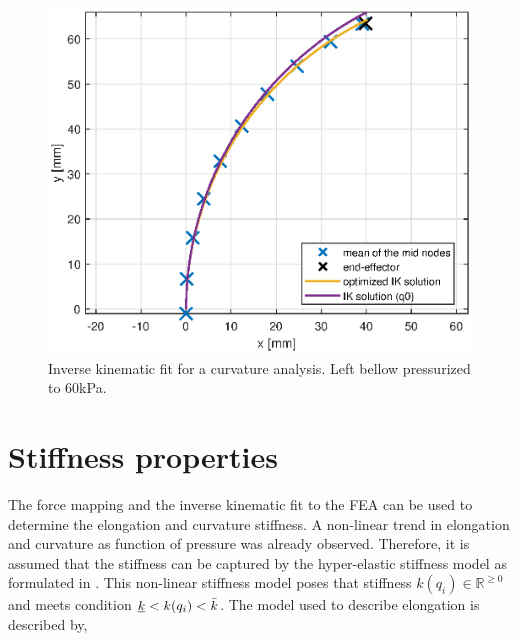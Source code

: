 \begin{figure}[H]
\begin{minipage}{0.5\textwidth}
    \end{minipage}\hfill
    \begin{minipage}{0.5\textwidth}
        \centering
        \includegraphics[width=\textwidth]{Figures/Chapter3/nodalfit.eps} 
        \caption{Inverse kinematic fit for a curvature analysis. Left bellow pressurized to 60kPa.}
        \label{fig3:nodalfitcurv}
    \end{minipage}
\end{figure}







\section{Stiffness properties}

The force mapping and the inverse kinematic fit to the FEA can be used to determine the elongation and curvature stiffness. A non-linear trend in elongation and curvature as function of pressure was already observed. Therefore, it is assumed that the stiffness can be captured by the hyper-elastic stiffness model as formulated in \cite{Caasenbrood2020StiffnessModel}. This non-linear stiffness model poses that stiffness $k(q_i) \in \mathbb{R}^{\geq 0}$ and meets condition $\underbar{$k$} < k(q_i) < \Bar{k}$. The model used to describe elongation is described by,

